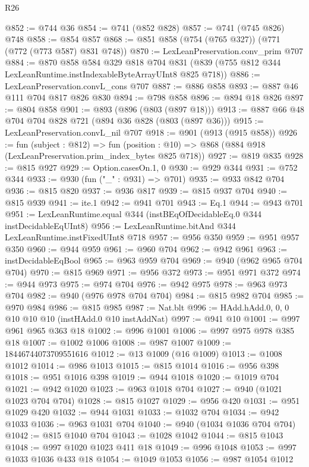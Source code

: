 \begin{lexlean}{R26}
\begin{coremodule}
@852 := @744 @36
@854 := @741 (@852 @828)
@857 := @741 (@745 @826) @748
@858 := @854 @857
@868 := @851 @858 (@754 (@765 @327)) (@771 (@772 (@773 @587) @831 @748))
@870 := LexLeanPreservation.conv_prim @707
@884 := @870
    @858
    @584
    @329
    @818
    @704
    @831
    (@839 (@755 @812 @344 LexLeanRuntime.instIndexableByteArrayUInt8 @825 @718))
@886 := LexLeanPreservation.convL_cons @707
@887 := @886 @858
@893 := @887 @46 @111 @704 @817 @826 @830
@894 := @798 @858
@896 := @894 @18 @826
@897 := @804 @858
@901 := @893 (@896 (@803 (@897 @18)))
@913 := @887 @66 @48 @704 @704 @828 @721 (@894 @36 @828 (@803 (@897 @36)))
@915 := LexLeanPreservation.convL_nil @707
@918 := @901 (@913 (@915 @858))
@926 := fun (subject : @812) =>
  fun (position : @10) => @868 (@884 @918 (LexLeanPreservation.prim_index_bytes @825 @718))
@927 := @819 @835
@928 := @815 @927
@929 := Option.casesOn.{1, 0}
@930 := @929 @344
@931 := @752 @344
@933 := @930 (fun ("_" : @931) => @701)
@935 := @933 @842 @704
@936 := @815 @820
@937 := @936 @817
@939 := @815 @937 @704
@940 := @815 @939
@941 := ite.{1}
@942 := @941 @701
@943 := Eq.{1}
@944 := @943 @701
@951 := LexLeanRuntime.equal @344 (instBEqOfDecidableEq.{0} @344 instDecidableEqUInt8)
@956 := LexLeanRuntime.bitAnd @344 LexLeanRuntime.instFixedUInt8 @718
@957 := @956 @350
@959 := @951 @957 @350
@960 := @944 @959
@961 := @960 @704
@962 := @942 @961
@963 := instDecidableEqBool
@965 := @963 @959 @704
@969 := @940 (@962 @965 @704 @704)
@970 := @815 @969
@971 := @956 @372
@973 := @951 @971 @372
@974 := @944 @973
@975 := @974 @704
@976 := @942 @975
@978 := @963 @973 @704
@982 := @940 (@976 @978 @704 @704)
@984 := @815 @982 @704
@985 := @970 @984
@986 := @815 @985
@987 := Nat.blt
@996 := HAdd.hAdd.{0, 0, 0} @10 @10 @10 (instHAdd.{0} @10 instAddNat)
@997 := @941 @10
@1001 := @997 @961 @965 @363 @18
@1002 := @996 @1001
@1006 := @997 @975 @978 @385 @18
@1007 := @1002 @1006
@1008 := @987 @1007
@1009 := 18446744073709551616
@1012 := @13 @1009 (@16 @1009)
@1013 := @1008 @1012
@1014 := @986 @1013
@1015 := @815 @1014
@1016 := @956 @398
@1018 := @951 @1016 @398
@1019 := @944 @1018
@1020 := @1019 @704
@1021 := @942 @1020
@1023 := @963 @1018 @704
@1027 := @940 (@1021 @1023 @704 @704)
@1028 := @815 @1027
@1029 := @956 @420
@1031 := @951 @1029 @420
@1032 := @944 @1031
@1033 := @1032 @704
@1034 := @942 @1033
@1036 := @963 @1031 @704
@1040 := @940 (@1034 @1036 @704 @704)
@1042 := @815 @1040 @704
@1043 := @1028 @1042
@1044 := @815 @1043
@1048 := @997 @1020 @1023 @411 @18
@1049 := @996 @1048
@1053 := @997 @1033 @1036 @433 @18
@1054 := @1049 @1053
@1056 := @987 @1054 @1012

\end{coremodule}
\end{lexlean}
